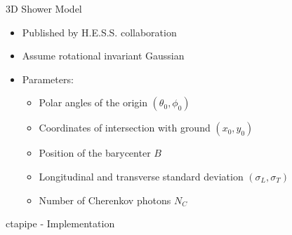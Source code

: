 \documentclass[aspectratio=1610, 9pt]{beamer}
\begin{document}
\begin{frame}{3D Shower Model}
    \begin{minipage}{0.49\textwidth}
        \begin{itemize}
            \item Published by H.E.S.S. collaboration
            \item Assume rotational invariant Gaussian
            \item Parameters: \begin{itemize}
                    \item Polar angles of the origin $(\theta_0,\phi_0)$
                    \item Coordinates of intersection with ground $(x_0,y_0)$
                    \item Position of the barycenter $B$
                    \item Longitudinal and transverse standard deviation $(\sigma_L, \sigma_T)$
                    \item Number of Cherenkov photons $N_C$
                \end{itemize}
        \end{itemize}
    \end{minipage}
    \hfill
    \begin{minipage}{0.5\textwidth}
        \centering
    \end{minipage}
\end{frame}

\begin{frame}
  \begin{center}
      \fontsize{40}{48} \selectfont\textcolor{tugreen}{ctapipe - Implementation}
  \end{center}
\end{frame}
\end{document}
